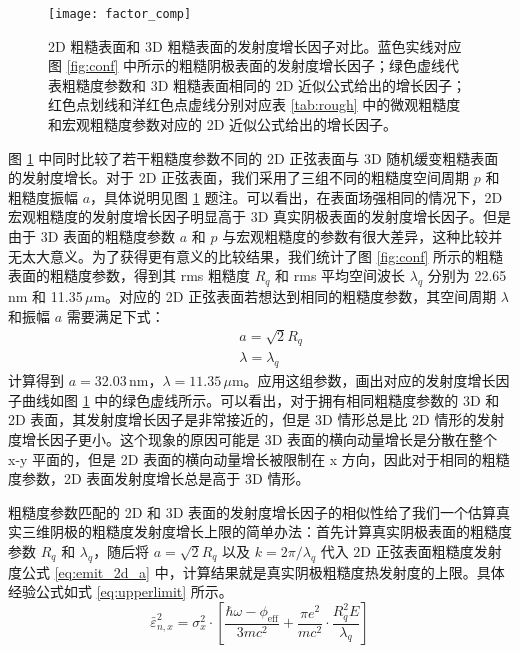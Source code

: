 \begin{figure}[htbp]
\centering
\texttt{[image: factor\_comp]}
\caption{\label{fig:factor_comp} 2D 粗糙表面和 3D 粗糙表面的发射度增长因子对比。蓝色实线对应图 \ref{fig:conf} 中所示的粗糙阴极表面的发射度增长因子；绿色虚线代表粗糙度参数和 3D 粗糙表面相同的 2D 近似公式给出的增长因子；红色点划线和洋红色点虚线分别对应表 \ref{tab:rough} 中的微观粗糙度和宏观粗糙度参数对应的 2D 近似公式给出的增长因子。}
\end{figure}

图 \ref{fig:factor_comp} 中同时比较了若干粗糙度参数不同的 2D 正弦表面与 3D 随机缓变粗糙表面的发射度增长。对于 2D 正弦表面，我们采用了三组不同的粗糙度空间周期 $p$ 和粗糙度振幅 $a$，具体说明见图 \ref{fig:factor_comp} 题注。可以看出，在表面场强相同的情况下，2D 宏观粗糙度的发射度增长因子明显高于 3D 真实阴极表面的发射度增长因子。但是由于 3D 表面的粗糙度参数 $a$ 和 $p$ 与宏观粗糙度的参数有很大差异，这种比较并无太大意义。为了获得更有意义的比较结果，我们统计了图 \ref{fig:conf} 所示的粗糙表面的粗糙度参数，得到其 rms 粗糙度 $R_q$ 和 rms 平均空间波长 $\lambda_q$ 分别为 22.65\,nm 和 11.35\,$\mu$m。对应的 2D 正弦表面若想达到相同的粗糙度参数，其空间周期 $\lambda$ 和振幅 $a$ 需要满足下式：
\begin{eqnarray*}
&&a = \sqrt{2}R_q \\
&&\lambda = \lambda_q
\end{eqnarray*}
计算得到 $a=32.03\,\text{nm}$，$\lambda=11.35\,\mu\text{m}$。应用这组参数，画出对应的发射度增长因子曲线如图 \ref{fig:factor_comp} 中的绿色虚线所示。可以看出，对于拥有相同粗糙度参数的 3D 和 2D 表面，其发射度增长因子是非常接近的，但是 3D 情形总是比 2D 情形的发射度增长因子更小。这个现象的原因可能是 3D 表面的横向动量增长是分散在整个 x-y 平面的，但是 2D 表面的横向动量增长被限制在 x 方向，因此对于相同的粗糙度参数，2D 表面发射度增长总是高于 3D 情形。

粗糙度参数匹配的 2D 和 3D 表面的发射度增长因子的相似性给了我们一个估算真实三维阴极的粗糙度发射度增长上限的简单办法：首先计算真实阴极表面的粗糙度参数 $R_q$ 和 $\lambda_q$，随后将 $a=\sqrt{2}R_q$ 以及 $k=2\pi/\lambda_q$ 代入 2D 正弦表面粗糙度发射度公式 \ref{eq:emit_2d_a} 中，计算结果就是真实阴极粗糙度热发射度的上限。具体经验公式如式 \ref{eq:upperlimit} 所示。
\begin{equation}
\bar{\varepsilon}_{n, x}^2 = \sigma_x^2\cdot\left[\frac{\hbar\omega-\phi_{\text{eff}}}{3mc^2}+\frac{\pi e^2}{mc^2}\cdot\frac{R_q^2E}{\lambda_q}\right]
\label{eq:upperlimit}
\end{equation}


